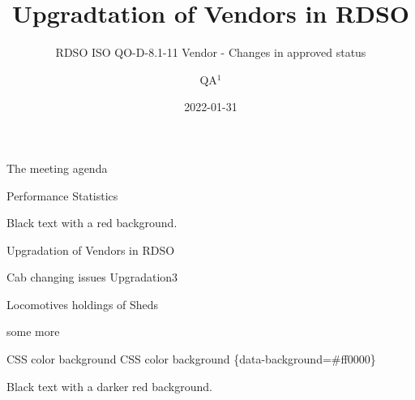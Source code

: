 \documentclass[
  ignorenonframetext,
]{beamer}
\title{Upgradtation of Vendors in RDSO}
\subtitle{RDSO ISO QO-D-8.1-11 Vendor - Changes in approved status}
\author{QA\(^1\)}
\date{2022-01-31}
\institute{\(^1\)QA(Mech)}
\begin{document}
\frame{\titlepage}

\begin{frame}[allowframebreaks]
  \tableofcontents[hideallsubsections]
\end{frame}
\begin{frame}
\end{frame}

\begin{frame}{The meeting agenda}
\protect\hypertarget{the-meeting-agenda}{}
\end{frame}

\begin{frame}{Performance Statistics}
\protect\hypertarget{performance-statistics}{}
\begin{shaded}
Black text with a red background.
\end{shaded}


\begin{block}{Upgradation of Vendors in RDSO}
\protect\hypertarget{upgradation-of-vendors-in-rdso}{}
\begin{block}{Cab changing issues}
\protect\hypertarget{cab-changing-issues}{}
Upgradation3
\end{block}
\end{block}
\end{frame}

\begin{frame}{Locomotives holdings of Sheds}
\protect\hypertarget{locomotives-holdings-of-sheds}{}
\end{frame}

\begin{frame}{some more}
\protect\hypertarget{some-more}{}
\end{frame}

\begin{frame}{CSS color background}
\protect\hypertarget{css-color-background}{}
CSS color background \{data-background=\#ff0000\}


\begin{shaded}

Black text with a darker red background.

\end{shaded}
\end{frame}
\end{document}
